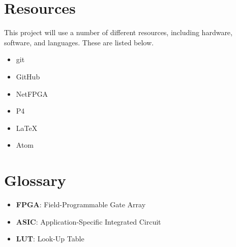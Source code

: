 \documentclass[12pt, a4paper, twoside, onecolumn]{article}
\begin{document}
\section{Resources}
\label{resources}
This project will use a number of different resources, including hardware, software, and languages. These are listed below.
\begin{itemize}
  \item git \cite{git}
  \item GitHub \cite{github}
  \item NetFPGA \cite{NetFPGA}
  \item P4 \cite{P4}
  \item LaTeX
  \item Atom
\end{itemize}

\section{Glossary}
\label{glossary}
\begin{itemize}
  \item \textbf{FPGA}: Field-Programmable Gate Array
  \item \textbf{ASIC}: Application-Specific Integrated Circuit
  \item \textbf{LUT}: Look-Up Table
\end{itemize}




\end{document}
